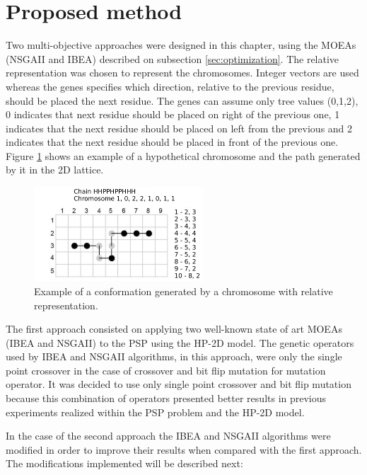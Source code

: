 \section{Proposed method}
\label{sec:proposedMethod}


Two multi-objective approaches were designed in this chapter, using the MOEAs (NSGAII and IBEA) described on subsection \ref{sec:optimization}. The relative representation was chosen to represent the chromosomes. Integer vectors are used whereas the genes specifies which direction, relative to the previous residue, should be placed the next residue. The genes can assume only tree values (0,1,2), 0 indicates that next residue should be placed on right of the previous one, 1 indicates that the next residue should be placed on left from the previous and 2 indicates that the next residue should be placed in front of the previous one. Figure \ref{fig_sim} shows an example of a hypothetical chromosome and the path generated by it in the 2D lattice.

\begin{figure}[ht]
	\centering
	\includegraphics[width=2.5in]{figures/figure3.png}
	\caption{Example of a conformation generated by a chromosome with relative representation.}
	\label{fig_sim}
\end{figure}


The first approach consisted on applying two well-known state of art MOEAs (IBEA and NSGAII) to the PSP using the HP-2D model. The genetic operators used by IBEA and NSGAII algorithms, in this approach, were only the single point crossover in the case of crossover and bit flip mutation for mutation operator.  It was decided to use only single point crossover and bit flip mutation because this combination of operators presented better results in previous experiments realized within the PSP problem and the HP-2D model.

In the case of the second approach the IBEA and NSGAII algorithms were modified in order to improve their results when compared with the first approach. The modifications implemented will be described next:


